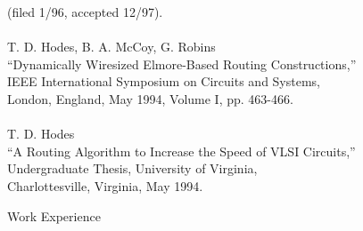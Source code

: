 \begin{tabbing}
(filed 1/96, accepted 12/97).  \\
\smallskip \\
\>    T. D. Hodes, B. A. McCoy, G. Robins \\
\>\>  ``Dynamically Wiresized Elmore-Based Routing Constructions,''  \\
\> IEEE International Symposium on Circuits and Systems, \\
\>\>   London, England, May 1994, Volume I, pp. 463-466. \\
\smallskip \\
\>  T. D. Hodes \\
\>\> ``A Routing Algorithm to Increase the Speed of VLSI Circuits,'' \\
\>\>       Undergraduate Thesis, University of Virginia, \\
\>\>       Charlottesville, Virginia, May 1994. 
\end{tabbing}
\newpage

\bigskip

\begin{bf} \large
Work Experience
\end{bf}
\medskip

